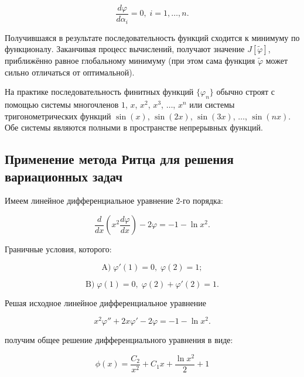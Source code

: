 \documentclass{article}
\begin{document}
\begin{equation}
	\frac{d\varphi}{d\alpha_{i}} = 0, \; i = 1, \ldots, n.
\end{equation}

Получившаяся в результате последовательность функций сходится к минимуму по функционалу. Заканчивая процесс вычислений, получают значение $J[\widetilde{\varphi}]$, приближённо равное глобальному минимуму (при этом сама функция $\widetilde{\varphi}$ может сильно отличаться от оптимальной).

На практике последовательность финитных функций ${\lbrace \varphi_{n} \rbrace}$ обычно строят с помощью системы многочленов $1$, $x$, $x^2$, $x^3$, $\ldots$, $x^n$ или системы тригонометрических функций $\sin (x)$, $\sin (2x)$, $\sin (3x)$, $\ldots$, $\sin (nx)$. Обе системы являются полными в пространстве непрерывных функций.

\subsection{Применение метода Ритца для решения вариационных задач}

Имеем линейное дифференциальное уравнение 2-го порядка:

\begin{equation}
	\frac{d}{dx}(x^2 \frac{d \varphi}{dx}) - 2\varphi = -1 - \ln{x^2}.
\end{equation}

\noindent Граничные условия, которого:

\begin{equation}
	\text{A)} \; \varphi'(1) = 0, \; \varphi(2) = 1;
\end{equation}

\begin{equation}
	\text{B)} \; \varphi(1) = 0, \; \varphi(2) + \varphi'(2) = 1.
\end{equation}

\noindent Решая исходное линейное дифференциальное уравнение

\begin{equation}
	x^2 \varphi'' + 2 x \varphi' - 2 \varphi = -1 - \ln{x^2}.
\end{equation}

\noindent получим общее решение дифференциального уравнения в виде:

\begin{equation}
	\phi(x) = \frac{C_{2}}{x^2} + C_{1}x + \frac{\ln{x^2}}{2} + 1
\end{equation}
\end{document}
